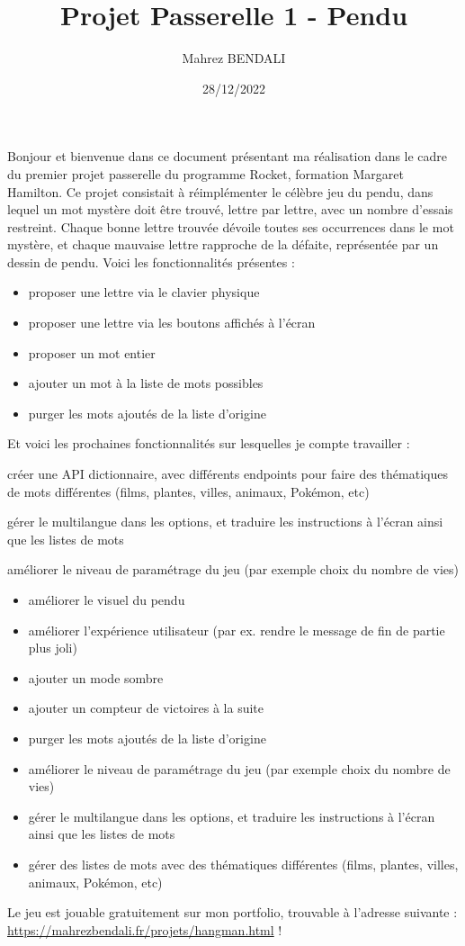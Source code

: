 \documentclass[12pt]{article}
\title{Projet Passerelle 1 - Pendu}
\author{Mahrez BENDALI}
\date{28/12/2022}
\begin{document}
\maketitle

Bonjour et bienvenue dans ce document présentant ma réalisation dans le cadre du premier projet passerelle du programme Rocket, formation Margaret Hamilton.
Ce projet consistait à réimplémenter le célèbre jeu du pendu, dans lequel un mot mystère doit être trouvé, lettre par lettre, avec un nombre d'essais restreint.
Chaque bonne lettre trouvée dévoile toutes ses occurrences dans le mot mystère, et chaque mauvaise lettre rapproche de la défaite, représentée par un dessin de pendu.
Voici les fonctionnalités présentes :

\begin{itemize}
  \item proposer une lettre via le clavier physique
  \item proposer une lettre via les boutons affichés à l'écran
  \item proposer un mot entier
  \item ajouter un mot à la liste de mots possibles
  \item purger les mots ajoutés de la liste d'origine
\end{itemize}

Et voici les prochaines fonctionnalités sur lesquelles je compte travailler : 



créer une API dictionnaire, avec différents endpoints pour faire des thématiques de mots différentes (films, plantes, villes, animaux, Pokémon, etc)

gérer le multilangue dans les options, et traduire les instructions à l'écran ainsi que les listes de mots

améliorer le niveau de paramétrage du jeu (par exemple choix du nombre de vies)



\begin{itemize}
    \item améliorer le visuel du pendu
    \item améliorer l'expérience utilisateur (par ex. rendre le message de fin de partie plus joli)
    \item ajouter un mode sombre
    \item ajouter un compteur de victoires à la suite
    \item purger les mots ajoutés de la liste d'origine
    \item améliorer le niveau de paramétrage du jeu (par exemple choix du nombre de vies)
    \item gérer le multilangue dans les options, et traduire les instructions à l'écran ainsi que les listes de mots
    \item gérer des listes de mots avec des thématiques différentes (films, plantes, villes, animaux, Pokémon, etc)
  \end{itemize}

Le jeu est jouable gratuitement sur mon portfolio, trouvable à l'adresse suivante : \href{https://mahrezbendali.fr/projets/hangman.html}{https://mahrezbendali.fr/projets/hangman.html} !
\end{document}
